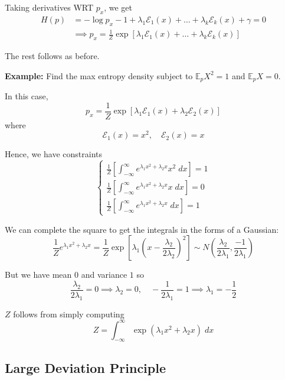 \documentclass[12pt]{report}
\newcommand{\E}{\mathbb{E}}
\newcommand{\Ec}{\mathcal{E}}
\newcommand*{\tbf}[1]{\ifmmode\mathbf{#1}\else\textbf{#1}\fi}
\begin{document}
Taking derivatives WRT $p_x$, we get
\begin{align*}
    H(p) & = -\log p_x - 1 + \lambda_1 \Ec_1(x) + \dots + \lambda_k \Ec_k(x) + \gamma = 0              \\
         & \implies p_x = \frac{1}{Z} \exp\left[\lambda_1 \Ec_1(x) + \dots + \lambda_k \Ec_k(x)\right]
\end{align*}

The rest follows as before.

\tbf{Example:} Find the max entropy density subject to $\E_p X^2 = 1$ and $\E_p X = 0$.

In this case,
\[p_x = \frac{1}{Z} \exp\left[\lambda_1 \Ec_1(x) + \lambda_2 \Ec_2(x)\right]\]
where
\[\Ec_1(x) = x^2, \quad \Ec_2(x) = x\]

Hence, we have constraints
\[\begin{cases}
        \frac{1}{Z} \left[\int_{-\infty}^{\infty} e^{\lambda_1 x^2 + \lambda_2 x} x^2\; dx\right] = 1 \\
        \frac{1}{Z} \left[\int_{-\infty}^{\infty} e^{\lambda_1 x^2 + \lambda_2 x} x\; dx\right] = 0   \\
        \frac{1}{Z} \left[\int_{-\infty}^{\infty} e^{\lambda_1 x^2 + \lambda_2 x}\; dx\right] = 1
    \end{cases}\]

We can complete the square to get the integrals in the forms of a Gaussian:
\[\frac{1}{Z}e^{\lambda_1 x^2  +\lambda_2 x} = \frac{1}{Z}\exp\left[\lambda_1 \left(x - \frac{\lambda_2}{2\lambda_2}\right)^2 \right] \sim N(\frac{\lambda_2}{2\lambda_1}, \frac{-1}{2\lambda_1})\]

But we have mean $0$ and variance $1$ so
\[\frac{\lambda_2}{2\lambda_1} = 0 \implies \lambda_2 = 0, \quad -\frac{1}{2\lambda_1} = 1 \implies \lambda_1 = -\frac{1}{2}\]

$Z$ follows from simply computing
\[Z = \int_{-\infty}^{\infty} \exp(\lambda_1 x^2 + \lambda_2 x)\; dx\]

\subsection{Large Deviation Principle}
\end{document}
